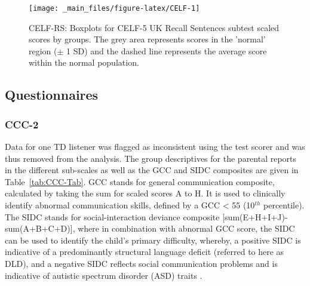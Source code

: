 \documentclass[a4paper, twoside]{templates/ociamthesis}
\begin{document}
\begin{figure}

{\centering \texttt{[image: \_main\_files/figure-latex/CELF-1]} 

}

\caption{CELF-RS: Boxplots for CELF-5 UK Recall Sentences subtest scaled scores by groups. The grey area represents scores in the 'normal' region ($\pm$ 1 SD) and the dashed line represents the average score within the normal population.}\label{fig:CELF}
\end{figure}

\hypertarget{questionnaires-1}{%
\subsection{Questionnaires}\label{questionnaires-1}}

\hypertarget{ccc-2}{%
\subsubsection{CCC-2}\label{ccc-2}}

Data for one TD listener was flagged as inconsistent using the test scorer and was thus removed from the analysis. The group descriptives for the parental reports in the different sub-scales as well as the GCC and SIDC composites are given in Table~\ref{tab:CCC-Tab}. GCC stands for general communication composite, calculated by taking the sum for scaled scores A to H. It is used to clinically identify abnormal communication skills, defined by a GCC \textless{} 55 (10\(^{th}\) percentile). The SIDC stands for social-interaction deviance composite {[}sum(E+H+I+J)-sum(A+B+C+D){]}, where in combination with abnormal GCC score, the SIDC can be used to identify the child's primary difficulty, whereby, a positive SIDC is indicative of a predominantly structural language deficit (referred to here as DLD), and a negative SIDC reflects social communication problems and is indicative of autistic spectrum disorder (ASD) traits \autocite{Norbury2014,Bishop2003}.\\
\end{document}
